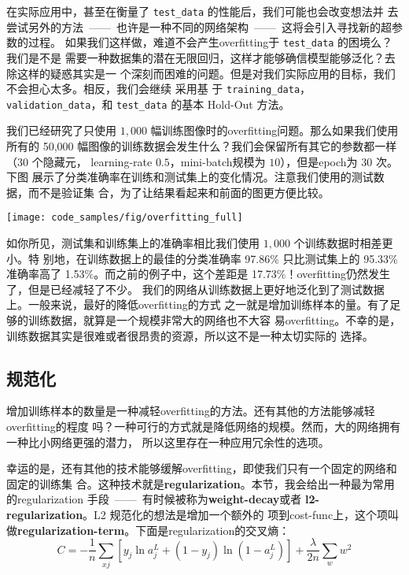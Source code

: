 在实际应用中，甚至在衡量了 \lstinline!test_data! 的性能后，我们可能也会改变想法并
去尝试另外的方法~——~也许是一种不同的网络架构~——~这将会引入寻找新的超参数的过程。
如果我们这样做，难道不会产生\gls*{overfitting}于 \lstinline!test_data! 的困境么？我们是不是
需要一种数据集的潜在无限回归，这样才能够确信模型能够泛化？去除这样的疑惑其实是一
个深刻而困难的问题。但是对我们实际应用的目标，我们不会担心太多。相反，我们会继续
采用基
于 \lstinline!training_data!，\lstinline!validation_data!，和
\lstinline!test_data! 的基本 Hold-Out 方法。

我们已经研究了只使用 $1,000$ 幅训练图像时的\gls*{overfitting}问题。那么如果我们使用所有的
50,000 幅图像的训练数据会发生什么？我们会保留所有其它的参数都一样（$30$ 个隐藏元，
  \gls*{learning-rate} $0.5$，\gls*{mini-batch}规模为 $10$），但是\gls*{epoch}为 30 次。下图
展示了分类准确率在训练和测试集上的变化情况。注意我们使用的测试数据，而不是验证集
合，为了让结果看起来和前面的图更方便比较。
\begin{center}
  \texttt{[image: code\_samples/fig/overfitting\_full]}
\end{center}

如你所见，测试集和训练集上的准确率相比我们使用 $1,000$ 个训练数据时相差更小。特
别地，在训练数据上的最佳的分类准确率 97.86\% 只比测试集上的 95.33\% 准确率高了
1.53\%。而之前的例子中，这个差距是 17.73\%！\gls*{overfitting}仍然发生了，但是已经减轻了不少。
我们的网络从训练数据上更好地泛化到了测试数据上。一般来说，最好的降低\gls*{overfitting}的方式
之一就是增加训练样本的量。有了足够的训练数据，就算是一个规模非常大的网络也不大容
易\gls*{overfitting}。不幸的是，训练数据其实是很难或者很昂贵的资源，所以这不是一种太切实际的
选择。

\subsection{规范化}

增加训练样本的数量是一种减轻\gls*{overfitting}的方法。还有其他的方法能够减轻\gls*{overfitting}的程度
吗？一种可行的方式就是降低网络的规模。然而，大的网络拥有一种比小网络更强的潜力，
所以这里存在一种应用冗余性的选项。

幸运的是，还有其他的技术能够缓解\gls*{overfitting}，即使我们只有一个固定的网络和固定的训练集
合。这种技术就是\textbf{\gls{regularization}}。本节，我会给出一种最为常用的\gls*{regularization}
手段~——~有时候被称为\textbf{\gls{weight-decay}}或者 \textbf{\gls{l2-regularization}}。L2 规范化的想法是增加一个额外的
项到\gls*{cost-func}上，这个项叫做\textbf{\gls{regularization-term}}。下面是\gls*{regularization}的交叉熵：
\begin{equation}
  C = -\frac{1}{n} \sum_{xj} \left[ y_j \ln a^L_j+(1-y_j) \ln
  (1-a^L_j)\right] + \frac{\lambda}{2n} \sum_w w^2
\label{eq:85}\tag{85}
\end{equation}

